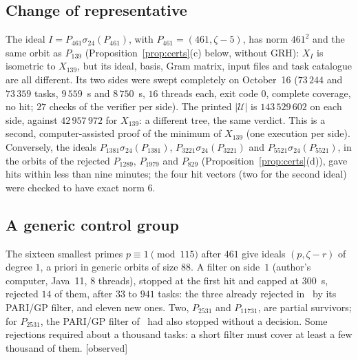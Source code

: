 \documentclass[11pt,a4paper]{amsart}
\theoremstyle{plain}
\theoremstyle{definition}
\newcommand{\Uc}{\mathcal{U}}
\newcommand{\st}[1]{\textup{\textsf{\small[#1]}}}
\newcommand{\CONS}{\st{observed}}
\begin{document}
\subsection{Change of representative}
The ideal $I=P_{461}\sigma_{24}(P_{461})$, with $P_{461}=(461,\zeta-5)$, has norm $461^2$ and the same orbit as $P_{139}$ (Proposition~\ref{prop:certs}(c) below, without GRH): $X_I$ is isometric to $X_{139}$, but its ideal, basis, Gram matrix, input files and task catalogue are all different. Its two sides were swept completely on October~16 ($73\,244$ and $73\,359$ tasks, $9\,559$~s and $8\,750$~s, $16$ threads each, exit code $0$, complete coverage, no hit; $27$ checks of the verifier per side). The printed $|\Uc|$ is $143\,529\,602$ on each side, against $42\,957\,972$ for $X_{139}$: a different tree, the same verdict. This is a second, computer-assisted proof of the minimum of $X_{139}$ (one execution per side). Conversely, the ideals $P_{1381}\sigma_{24}(P_{1381})$, $P_{3221}\sigma_{24}(P_{3221})$ and $P_{5521}\sigma_{24}(P_{5521})$, in the orbits of the rejected $P_{1289}$, $P_{1979}$ and $P_{829}$ (Proposition~\ref{prop:certs}(d)), gave hits within less than nine minutes; the four hit vectors (two for the second ideal) were checked to have exact norm $6$.

\subsection{A generic control group}
The sixteen smallest primes $p\equiv1\pmod{115}$ after $461$ give ideals $(p,\zeta-r)$ of degree $1$, a priori in generic orbits of size $88$. A filter on side~$1$ (author's computer, Java~11, $8$ threads), stopped at the first hit and capped at $300$~s, rejected $14$ of them, after $33$ to $941$ tasks: the three already rejected in~\cite{Gau26} by its PARI/GP filter, and eleven new ones. Two, $P_{2531}$ and $P_{11731}$, are partial survivors; for $P_{2531}$, the PARI/GP filter of~\cite{Gau26} had also stopped without a decision. Some rejections required about a thousand tasks: a short filter must cover at least a few thousand of them. \CONS
\end{document}
